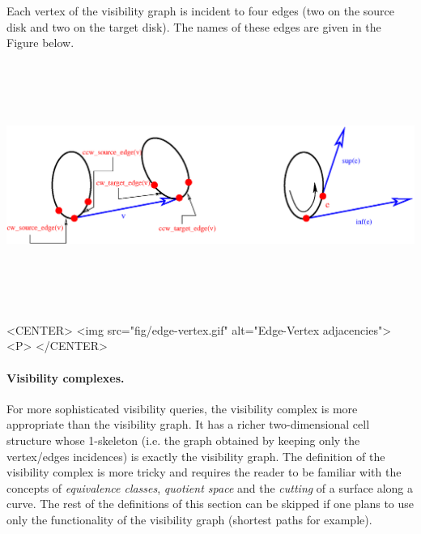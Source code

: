 Each vertex of the visibility graph is incident to four edges (two on the source
disk and two on the target disk). The names of these edges are given in the
Figure below.
\begin{ccTexOnly}
    \begin{center}
	\includegraphics[height=8cm]{fig/edge-vertex.eps}%
    \end{center}
\end{ccTexOnly}

\begin{ccHtmlOnly}
    <CENTER>
	<img src="fig/edge-vertex.gif" alt="Edge-Vertex adjacencies"><P>
    </CENTER>
\end{ccHtmlOnly}

\paragraph{Visibility complexes. }
For more sophisticated visibility queries, the visibility complex is more
appropriate than the visibility graph. It has a richer two-dimensional cell
structure whose 1-skeleton (i.e. the graph obtained by keeping only the
vertex/edges incidences) is exactly the visibility graph. The definition of the
visibility complex is more tricky and requires the reader to be familiar with
the concepts of \emph{equivalence classes}, \emph{quotient space} and the
\emph{cutting} of a surface along a curve. The rest of the definitions of this
section can be skipped if one plans to use only the functionality of the
visibility graph (shortest paths for example).

